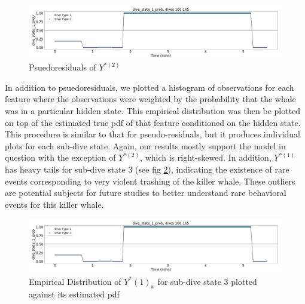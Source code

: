 \begin{figure}[h!]
	\centering
	\includegraphics[width=5in]{../Plots/Coarse_state_probs.png}
	\caption{Psuedoresiduals of $Y^{*(2)}$}
	\label{fig:pseudoresids}
\end{figure}

In addition to psuedoresiduals, we plotted a histogram of observations for each feature where the observations were weighted by the probability that the whale was in a particular hidden state. This empirical distribution was then be plotted on top of the estimated true pdf of that feature conditioned on the hidden state. This procedure is similar to that for pseudo-residuals, but it produces individual plots for each sub-dive state. Again, our results mostly support the model in question with the exception of $Y^{*(2)}$, which is right-skewed. In addition, $Y^{*(1)}$ has heavy tails for sub-dive state 3 (see fig \ref{fig:empirical_dist}), indicating the existence of rare events corresponding to very violent trashing of the killer whale. These outliers are potential subjects for future studies to better understand rare behavioral events for this killer whale.

\begin{figure}[h!]
	\centering
	\includegraphics[width=5in]{../Plots/Coarse_state_probs.png}
	\caption{Empirical Distribution of $Y^*(1)_x$ for sub-dive state 3 plotted against its estimated pdf}
	\label{fig:empirical_dist}
\end{figure}